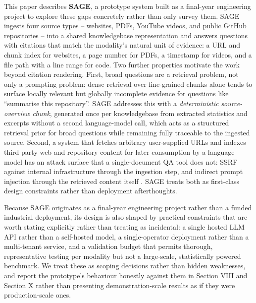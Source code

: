 \documentclass[conference]{IEEEtran}
\begin{document}
This paper describes \textbf{SAGE}, a prototype system built as a
final-year engineering project to explore these gaps concretely rather
than only survey them. SAGE ingests four source types -- websites, PDFs,
YouTube videos, and public GitHub repositories -- into a shared
knowledgebase representation and answers questions with citations that
match the modality's natural unit of evidence: a URL and chunk index for
websites, a page number for PDFs, a timestamp for videos, and a file
path with a line range for code. Two further properties motivate the
work beyond citation rendering. First, broad questions are a retrieval
problem, not only a prompting problem: dense retrieval over
fine-grained chunks alone tends to surface locally relevant but globally
incomplete evidence for questions like ``summarise this repository''.
SAGE addresses this with a \emph{deterministic source-overview chunk},
generated once per knowledgebase from extracted statistics and excerpts
without a second language-model call, which acts as a structured
retrieval prior for broad questions while remaining fully traceable to
the ingested source. Second, a system that fetches arbitrary
user-supplied URLs and indexes third-party web and repository content
for later consumption by a language model has an attack surface that a
single-document QA tool does not: SSRF against internal infrastructure
through the ingestion step, and indirect prompt injection through the
retrieved content itself \cite{greshake2023injection}. SAGE treats both as
first-class design constraints rather than deployment afterthoughts.

Because SAGE originates as a final-year engineering project rather than
a funded industrial deployment, its design is also shaped by practical
constraints that are worth stating explicitly rather than treating as
incidental: a single hosted LLM API rather than a self-hosted model, a
single-operator deployment rather than a multi-tenant service, and a
validation budget that permits thorough, representative testing per
modality but not a large-scale, statistically powered benchmark. We
treat these as scoping decisions rather than hidden weaknesses, and
report the prototype's behaviour honestly against them in Section VIII
and Section X rather than presenting demonstration-scale results as if
they were production-scale ones.
\end{document}
